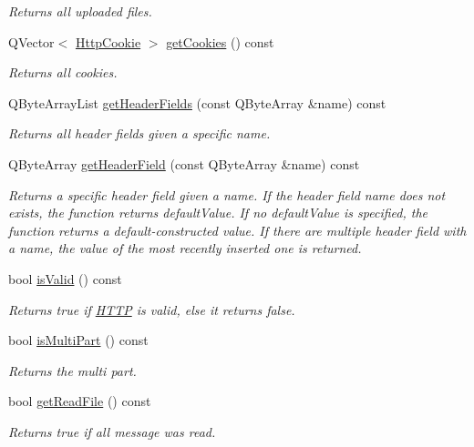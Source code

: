 \begin{DoxyCompactItemize}
\begin{DoxyCompactList}\small\item\em Returns all uploaded files. \end{DoxyCompactList}\item 
Q\+Vector$<$ \hyperlink{class_http_cookie}{Http\+Cookie} $>$ \hyperlink{class_http_parser_adacd6d1e9e28ddb21e35d47a965506e3}{get\+Cookies} () const
\begin{DoxyCompactList}\small\item\em Returns all cookies. \end{DoxyCompactList}\item 
Q\+Byte\+Array\+List \hyperlink{class_http_parser_ad1db732c8824dd7e91653fd956fc3bf5}{get\+Header\+Fields} (const Q\+Byte\+Array \&name) const
\begin{DoxyCompactList}\small\item\em Returns all header fields given a specific name. \end{DoxyCompactList}\item 
Q\+Byte\+Array \hyperlink{class_http_parser_aa754b731300bd5cf6dc82fa038089aaa}{get\+Header\+Field} (const Q\+Byte\+Array \&name) const
\begin{DoxyCompactList}\small\item\em Returns a specific header field given a name. If the header field name does not exists, the function returns default\+Value. If no default\+Value is specified, the function returns a default-\/constructed value. If there are multiple header field with a name, the value of the most recently inserted one is returned. \end{DoxyCompactList}\item 
bool \hyperlink{class_http_parser_a75e0872ac2323b7bd583ea5547503a50}{is\+Valid} () const
\begin{DoxyCompactList}\small\item\em Returns true if \hyperlink{namespace_h_t_t_p}{H\+T\+TP} is valid, else it returns false. \end{DoxyCompactList}\item 
bool \hyperlink{class_http_parser_acbb3148607d2a3c80ba4e74573165f1d}{is\+Multi\+Part} () const
\begin{DoxyCompactList}\small\item\em Returns the multi part. \end{DoxyCompactList}\item 
bool \hyperlink{class_http_parser_aba65276efdd7ccfd93ff03f29f80889f}{get\+Read\+File} () const
\begin{DoxyCompactList}\small\item\em Returns true if all message was read. \end{DoxyCompactList}\end{DoxyCompactItemize}
